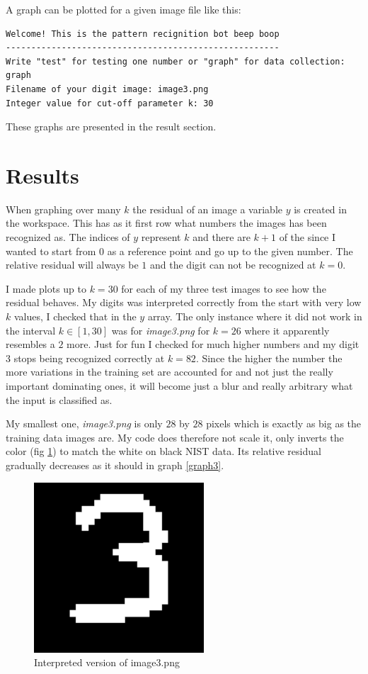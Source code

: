 \documentclass[notitlepage]{report}
\begin{document}
A graph can be plotted for a given image file like this:
\begin{verbatim}
Welcome! This is the pattern recignition bot beep boop
------------------------------------------------------
Write "test" for testing one number or "graph" for data collection: graph
Filename of your digit image: image3.png
Integer value for cut-off parameter k: 30
\end{verbatim}
These graphs are presented in the result section.

\newpage

\section{Results}
When graphing over many $k$ the residual of an image a variable $y$ is created in the workspace. This has as it first row what numbers the images has been recognized as. The indices of $y$ represent $k$ and there are $k+1$ of the since I wanted to start from 0 as a reference point and go up to the given number. The relative residual will always be $1$ and the digit can not be recognized at $k=0$. 

I made plots up to $k=30$ for each of my three test images to see how the residual behaves. My digits was interpreted correctly from the start with very low $k$ values, I checked that in the $y$ array. The only instance where it did not work in the interval $k\in[1, 30]$ was for \textit{image3.png} for $k=26$ where it apparently resembles a $2$ more. Just for fun I checked for much higher numbers and my digit 3 stops being recognized correctly at $k=82$. Since the higher the number the more variations in the training set are accounted for and not just the really important dominating ones, it will become just a blur and really arbitrary what the input is classified as.

My smallest one, \textit{image3.png} is only $28$ by $28$ pixels which is exactly as big as the training data images are. My code does therefore not scale it, only inverts the color (fig \ref{out3}) to match the white on black NIST data. Its relative residual gradually decreases as it should in graph \ref{graph3}.
\begin{figure}[!ht]
\centering
\includegraphics[scale=0.25]{output3.png}
\caption{Interpreted version of image3.png}
\label{out3}
\end{figure}
\end{document}
